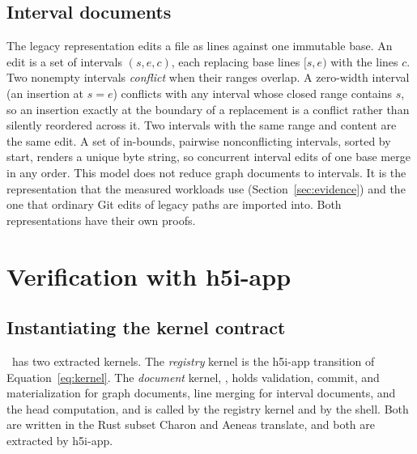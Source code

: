 \subsection{Interval documents}\label{sec:interval}
The legacy representation edits a file as lines against one immutable base. An edit is a set of intervals $(s,e,c)$, each replacing base lines $[s,e)$ with the lines $c$. Two nonempty intervals \emph{conflict} when their ranges overlap. A zero-width interval (an insertion at $s=e$) conflicts with any interval whose closed range contains $s$, so an insertion exactly at the boundary of a replacement is a conflict rather than silently reordered across it. Two intervals with the same range and content are the same edit. A set of in-bounds, pairwise nonconflicting intervals, sorted by start, renders a unique byte string, so concurrent interval edits of one base merge in any order. This model does not reduce graph documents to intervals. It is the representation that the measured workloads use (Section~\ref{sec:evidence}) and the one that ordinary Git edits of legacy paths are imported into. Both representations have their own proofs.

\section{Verification with h5i-app}\label{sec:verification}
\subsection{Instantiating the kernel contract}\label{sec:toolchain}
\sys\ has two extracted kernels. The \emph{registry} kernel is the h5i-app transition of Equation~\ref{eq:kernel}. The \emph{document} kernel, , holds validation, commit, and materialization for graph documents, line merging for interval documents, and the head computation, and is called by the registry kernel and by the shell. Both are written in the Rust subset Charon and Aeneas translate, and both are extracted by h5i-app.

